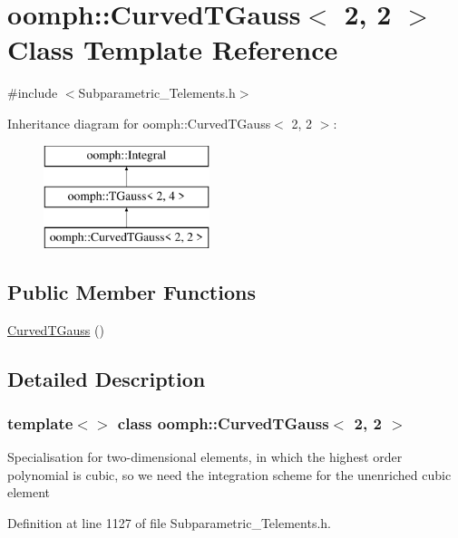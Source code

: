\hypertarget{classoomph_1_1CurvedTGauss_3_012_00_012_01_4}{}\section{oomph\+:\+:Curved\+T\+Gauss$<$ 2, 2 $>$ Class Template Reference}
\label{classoomph_1_1CurvedTGauss_3_012_00_012_01_4}


{\ttfamily \#include $<$Subparametric\+\_\+\+Telements.\+h$>$}

Inheritance diagram for oomph\+:\+:Curved\+T\+Gauss$<$ 2, 2 $>$\+:\begin{figure}[H]
\begin{center}
\leavevmode
\includegraphics[height=3.000000cm]{classoomph_1_1CurvedTGauss_3_012_00_012_01_4}
\end{center}
\end{figure}
\subsection*{Public Member Functions}
\begin{DoxyCompactItemize}
\item 
\hyperlink{classoomph_1_1CurvedTGauss_3_012_00_012_01_4_af5146d11a77146251cdcf69f22a6d029}{Curved\+T\+Gauss} ()
\end{DoxyCompactItemize}


\subsection{Detailed Description}
\subsubsection*{template$<$$>$\newline
class oomph\+::\+Curved\+T\+Gauss$<$ 2, 2 $>$}

Specialisation for two-\/dimensional elements, in which the highest order polynomial is cubic, so we need the integration scheme for the unenriched cubic element 

Definition at line 1127 of file Subparametric\+\_\+\+Telements.\+h.



